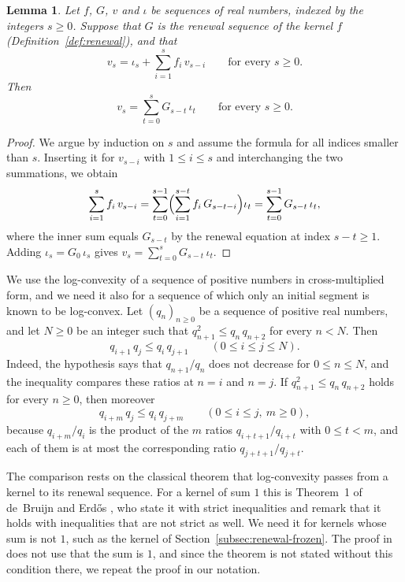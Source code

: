 \documentclass{amsart}
\newtheorem{lemma}[theorem]{Lemma}
\theoremstyle{definition}
\theoremstyle{remark}
\numberwithin{equation}{section}
\begin{document}
\begin{lemma}\label{lem:convolutionform}
Let $f$, $G$, $v$ and $\iota$ be sequences of real numbers, indexed by the integers $s\ge 0$. Suppose that $G$ is the renewal sequence of the kernel $f$ (Definition~\ref{def:renewal}), and that
\[
v_s=\iota_s+\sum_{i=1}^{s}f_i\,v_{s-i}\qquad\text{for every } s\ge 0 .
\]
Then
\[
v_s=\sum_{t=0}^{s}G_{s-t}\,\iota_t\qquad\text{for every } s\ge 0 .
\]
\end{lemma}

\begin{proof}
We argue by induction on $s$ and assume the formula for all indices smaller than $s$. Inserting it for $v_{s-i}$ with $1\le i\le s$ and interchanging the two summations, we obtain
\[
\sum_{i=1}^{s}f_i\,v_{s-i}=\sum_{t=0}^{s-1}\Bigl(\sum_{i=1}^{s-t}f_i\,G_{s-t-i}\Bigr)\iota_t=\sum_{t=0}^{s-1}G_{s-t}\,\iota_t,
\]
where the inner sum equals $G_{s-t}$ by the renewal equation at index $s-t\ge 1$. Adding $\iota_s=G_0\,\iota_s$ gives $v_s=\sum_{t=0}^{s}G_{s-t}\,\iota_t$.
\end{proof}

We use the log-convexity of a sequence of positive numbers in cross-multiplied form, and we need it also for a sequence of which only an initial segment is known to be log-convex. Let $(q_n)_{n\ge 0}$ be a sequence of positive real numbers, and let $N\ge 0$ be an integer such that $q_{n+1}^2\le q_n\,q_{n+2}$ for every $n<N$. Then
\begin{equation}\label{eq:renewal-cross}
q_{i+1}\,q_j\le q_i\,q_{j+1}\qquad(0\le i\le j\le N).
\end{equation}
Indeed, the hypothesis says that $q_{n+1}/q_n$ does not decrease for $0\le n\le N$, and the inequality compares these ratios at $n=i$ and $n=j$. If $q_{n+1}^2\le q_n\,q_{n+2}$ holds for every $n\ge 0$, then moreover
\begin{equation}\label{eq:renewal-shift}
q_{i+m}\,q_j\le q_i\,q_{j+m}\qquad(0\le i\le j,\ m\ge 0),
\end{equation}
because $q_{i+m}/q_i$ is the product of the $m$ ratios $q_{i+t+1}/q_{i+t}$ with $0\le t<m$, and each of them is at most the corresponding ratio $q_{j+t+1}/q_{j+t}$.

The comparison rests on the classical theorem that log-convexity passes from a kernel to its renewal sequence. For a kernel of sum $1$ this is Theorem~1 of de~Bruijn and Erd\H{o}s \cite[pp.~161--162]{debruijn1953}, who state it with strict inequalities and remark that it holds with inequalities that are not strict as well. We need it for kernels whose sum is not $1$, such as the kernel of Section~\ref{subsec:renewal-frozen}. The proof in \cite{debruijn1953} does not use that the sum is $1$, and since the theorem is not stated without this condition there, we repeat the proof in our notation.
\end{document}

